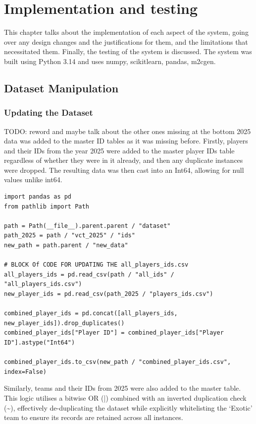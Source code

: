 \chapter{Implementation and testing}
This chapter talks about the implementation of each aspect of the system, going over any design changes and the justifications for them, and the limitations that necessitated them. Finally, the testing of the system is discussed. The system was built using Python 3.14 and uses numpy, scikitlearn, pandas, m2cgen.

\section{Dataset Manipulation}
\subsection{Updating the Dataset}
TODO: reword and maybe talk about the other ones missing at the bottom
2025 data was added to the master ID tables as it was missing before. Firstly, players and their IDs from the year 2025 were added to the master player IDs table regardless of whether they were in it already, and then any duplicate instances were dropped. The resulting data was then cast into an Int64, allowing for null values unlike int64.
\begin{lstlisting}[style=code]
import pandas as pd
from pathlib import Path

path = Path(__file__).parent.parent / "dataset"
path_2025 = path / "vct_2025" / "ids"
new_path = path.parent / "new_data"

# BLOCK Of CODE FOR UPDATING THE all_players_ids.csv
all_players_ids = pd.read_csv(path / "all_ids" / "all_players_ids.csv")
new_player_ids = pd.read_csv(path_2025 / "players_ids.csv")

combined_player_ids = pd.concat([all_players_ids, new_player_ids]).drop_duplicates()
combined_player_ids["Player ID"] = combined_player_ids["Player ID"].astype("Int64")

combined_player_ids.to_csv(new_path / "combined_player_ids.csv", index=False)
\end{lstlisting}

Similarly, teams and their IDs from 2025 were also added to the master table. This logic utilises a bitwise OR (|) combined with an inverted duplication check (\textasciitilde), effectively de-duplicating the dataset while explicitly whitelisting the `Exotic' team to ensure its records are retained across all instances.

